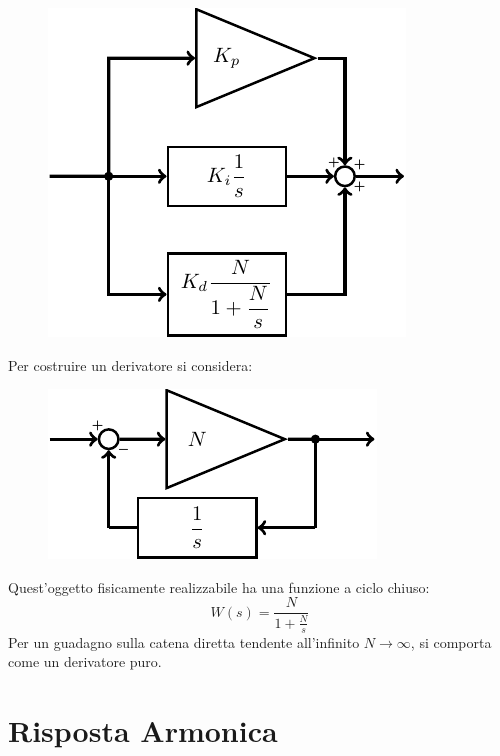 \documentclass{article}
\numberwithin{equation}{subsection}
\begin{document}
\begin{figure}[H]%
    \centering
    \includegraphics{pid-2.pdf}%
\end{figure}
Per costruire un derivatore si considera: 
\begin{figure}[H]%
    \centering
    \includegraphics{derivatore.pdf}%
\end{figure}
Quest'oggetto fisicamente realizzabile ha una funzione a ciclo chiuso: 
\begin{equation*}
    W(s)=\displaystyle\frac{N}{1+\displaystyle\frac{N}{s}}
\end{equation*}
Per un guadagno sulla catena diretta tendente all'infinito $N\to\infty$, si comporta come un derivatore puro. 

\clearpage 

\section{Risposta Armonica}
\end{document}
